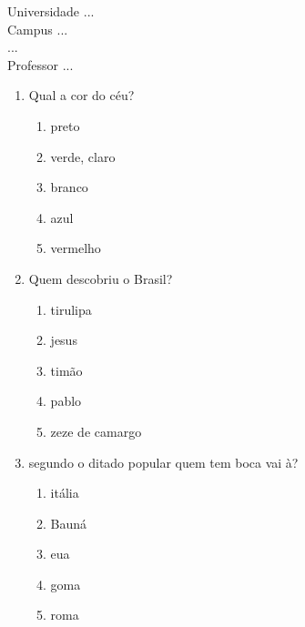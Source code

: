 \documentclass[10pt,a4paper,twocolumn]{report}
\begin{document}
\begin{flushleft}
Universidade ...\\
Campus ...\\
...\\
Professor ...\\
\end{flushleft}




 \begin{enumerate} 
    \item  Qual a cor do céu?





    \begin{enumerate}
    \item  preto

\item  verde, claro

\item  branco

\item  azul

\item  vermelho


    \end{enumerate} 
    \item  Quem descobriu o Brasil?





    \begin{enumerate}
    \item  tirulipa

\item  jesus

\item  timão

\item  pablo

\item  zeze de camargo


    \end{enumerate} 
    \item  segundo o ditado popular quem tem boca vai à?





    \begin{enumerate}
    \item  itália

\item  Bauná

\item  eua

\item  goma

\item  roma


    \end{enumerate}\end{enumerate} 
\end{document}
